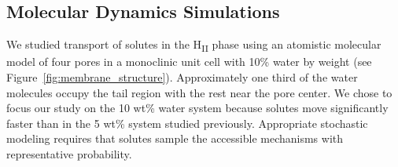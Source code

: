 \documentclass{article}
\begin{document}
  \subsection{Molecular Dynamics Simulations}

  We studied transport of solutes in the H\textsubscript{II} phase using an atomistic
  molecular model of four pores in a monoclinic unit cell with 10\% water by weight 
  (see Figure~\ref{fig:membrane_structure}). Approximately one third of the water 
  molecules occupy the tail region with the rest near the pore center. We chose to
  focus our study on the 10 wt\% water system because solutes move significantly 
  faster than in the 5 wt\% system studied previously. Appropriate stochastic 
  modeling requires that solutes sample the accessible mechanisms with representative
  probability.
  
\end{document}
